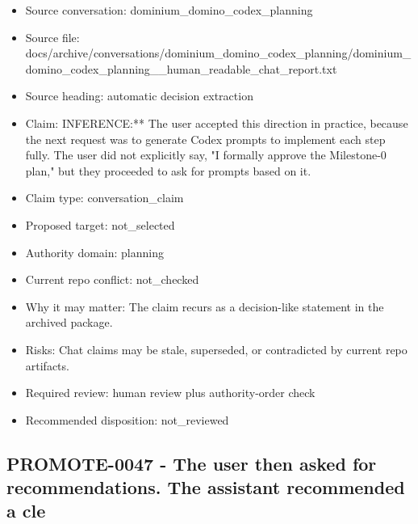 \documentclass[11pt,a4paper]{report}
\begin{document}
\begin{itemize}
\item Source conversation: dominium\_domino\_codex\_planning
\item Source file: docs/archive/conversations/dominium\_domino\_codex\_planning/dominium\_domino\_codex\_planning\_\_human\_readable\_chat\_report.txt
\item Source heading: automatic decision extraction
\item Claim: INFERENCE:** The user accepted this direction in practice, because the next request was to generate Codex prompts to implement each step fully. The user did not explicitly say, "I formally approve the Milestone-0 plan," but they proceeded to ask for prompts based on it.
\item Claim type: conversation\_claim
\item Proposed target: not\_selected
\item Authority domain: planning
\item Current repo conflict: not\_checked
\item Why it may matter: The claim recurs as a decision-like statement in the archived package.
\item Risks: Chat claims may be stale, superseded, or contradicted by current repo artifacts.
\item Required review: human review plus authority-order check
\item Recommended disposition: not\_reviewed
\end{itemize}

\subsection{PROMOTE-0047 - The user then asked for recommendations. The assistant recommended a cle}
\end{document}
